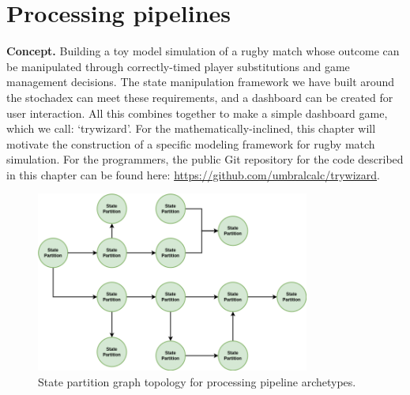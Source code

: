 \chapter{\sffamily Processing pipelines}

{\bfseries\sffamily Concept.} Building a toy model simulation of a rugby match whose outcome can be manipulated through correctly-timed player substitutions and game management decisions. The state manipulation framework we have built around the stochadex can meet these requirements, and a dashboard can be created for user interaction. All this combines together to make a simple dashboard game, which we call: `trywizard'. For the mathematically-inclined, this chapter will motivate the construction of a specific modeling framework for rugby match simulation. For the programmers, the public Git repository for the code described in this chapter can be found here: \href{https://github.com/umbralcalc/trywizard}{https://github.com/umbralcalc/trywizard}.

\begin{figure}[h]
\centering
\includegraphics[width=9cm]{images/chapter-9-state-partition-graph.drawio.png}
\caption{State partition graph topology for processing pipeline archetypes.}
\label{fig:state-partition-graph-processing-pipelines}
\end{figure}
